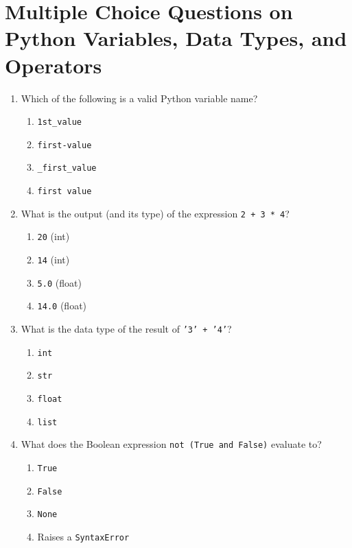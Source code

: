 \documentclass{article}
\begin{document}
\section*{Multiple Choice Questions on Python Variables, Data Types, and Operators}

\begin{enumerate}[leftmargin=0pt,label=\arabic*.]

  \item Which of the following is a valid Python variable name?
  \begin{enumerate}[label=(\alph*)]
    \item \texttt{1st\_value}
    \item \texttt{first-value}
    \item \texttt{\_first\_value}
    \item \texttt{first value}
  \end{enumerate}

  \item What is the output (and its type) of the expression \texttt{2 + 3 * 4}?
  \begin{enumerate}[label=(\alph*)]
    \item \texttt{20} (int)
    \item \texttt{14} (int)
    \item \texttt{5.0} (float)
    \item \texttt{14.0} (float)
  \end{enumerate}

  \item What is the data type of the result of \texttt{'3' + '4'}?
  \begin{enumerate}[label=(\alph*)]
    \item \texttt{int}
    \item \texttt{str}
    \item \texttt{float}
    \item \texttt{list}
  \end{enumerate}

  \item What does the Boolean expression \texttt{not (True and False)} evaluate to?
  \begin{enumerate}[label=(\alph*)]
    \item \texttt{True}
    \item \texttt{False}
    \item \texttt{None}
    \item Raises a \texttt{SyntaxError}
  \end{enumerate}


\end{enumerate}
\end{document}
